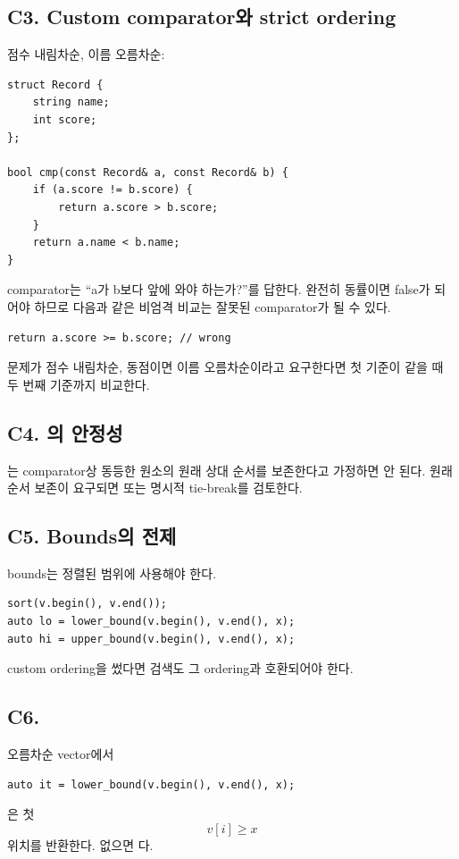 \subsection{C3. Custom comparator와 strict ordering}
점수 내림차순, 이름 오름차순:
\begin{lstlisting}
struct Record {
    string name;
    int score;
};

bool cmp(const Record& a, const Record& b) {
    if (a.score != b.score) {
        return a.score > b.score;
    }
    return a.name < b.name;
}
\end{lstlisting}

comparator는 “a가 b보다 앞에 와야 하는가?”를 답한다. 완전히 동률이면 false가 되어야 하므로 다음과 같은 비엄격 비교는 잘못된 comparator가 될 수 있다.
\begin{lstlisting}
return a.score >= b.score; // wrong
\end{lstlisting}

\begin{keybox}
문제가 점수 내림차순, 동점이면 이름 오름차순이라고 요구한다면 첫 기준이 같을 때 두 번째 기준까지 비교한다.
\end{keybox}

\subsection{C4. 의 안정성}
는 comparator상 동등한 원소의 원래 상대 순서를 보존한다고 가정하면 안 된다. 원래 순서 보존이 요구되면  또는 명시적 tie-break를 검토한다.

\subsection{C5. Bounds의 전제}
bounds는 정렬된 범위에 사용해야 한다.
\begin{lstlisting}
sort(v.begin(), v.end());
auto lo = lower_bound(v.begin(), v.end(), x);
auto hi = upper_bound(v.begin(), v.end(), x);
\end{lstlisting}
custom ordering을 썼다면 검색도 그 ordering과 호환되어야 한다.

\subsection{C6. }
오름차순 vector에서
\begin{lstlisting}
auto it = lower_bound(v.begin(), v.end(), x);
\end{lstlisting}
은 첫
\[
v[i]\ge x
\]
위치를 반환한다. 없으면 다.

